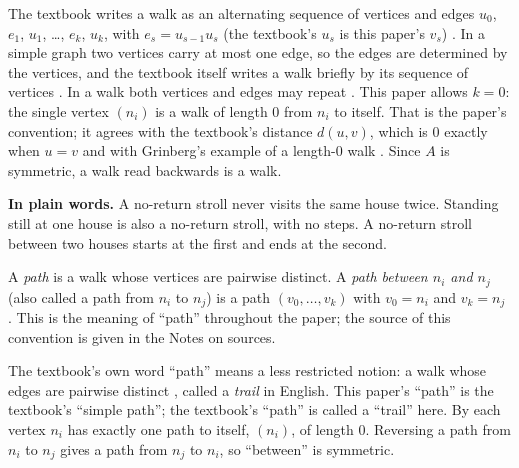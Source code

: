 The textbook writes a walk as an alternating sequence of vertices and edges $u_0$, $e_1$, $u_1$, \dots, $e_k$, $u_k$, with $e_s = u_{s-1}u_s$ (the textbook's $u_s$ is this paper's $v_s$) \cite[Definition 1.2.10, p.~21]{petrosyan_graph_theory}. In a simple graph two vertices carry at most one edge, so the edges are determined by the vertices, and the textbook itself writes a walk briefly by its sequence of vertices \cite[p.~21, the sentence after Definition 1.2.10]{petrosyan_graph_theory}. In a walk both vertices and edges may repeat \cite[p.~22]{petrosyan_graph_theory}. This paper allows $k = 0$: the single vertex $(n_i)$ is a walk of length $0$ from $n_i$ to itself. That is the paper's convention; it agrees with the textbook's distance $d(u,v)$, which is $0$ exactly when $u = v$ \cite[p.~23]{petrosyan_graph_theory} and with Grinberg's example of a length-$0$ walk \cite[Example 2.9.2, p.~37]{grinberg_graph_theory}. Since $A$ is symmetric, a walk read backwards is a walk.

\plainstart\textbf{In plain words.} A no-return stroll never visits the same house twice. Standing still at one house is also a no-return stroll, with no steps. A no-return stroll between two houses starts at the first and ends at the second.\plainend
\begin{definition}\label{def:path}
A \emph{path} is a walk whose vertices are pairwise distinct. A \emph{path between $n_i$ and $n_j$} (also called a path from $n_i$ to $n_j$) is a path $(v_0, \dots, v_k)$ with $v_0 = n_i$ and $v_k = n_j$ \cite[Definition 1.2.13, p.~22]{petrosyan_graph_theory} \cite[Definition 2.9.1(c),(d), p.~36]{grinberg_graph_theory} \cite[definition of path after Theorem 1, p.~1]{bai_bimsa_adjacency}. This is the meaning of ``path'' throughout the paper; the source of this convention is given in the Notes on sources.
\end{definition}

\begin{remark}\label{rem:trap}
The textbook's own word ``path'' means a less restricted notion: a walk whose edges are pairwise distinct \cite[Definition 1.2.12, p.~22]{petrosyan_graph_theory}, called a \emph{trail} in English. This paper's ``path'' is the textbook's ``simple path''; the textbook's ``path'' is called a ``trail'' here. By  each vertex $n_i$ has exactly one path to itself, $(n_i)$, of length $0$. Reversing a path from $n_i$ to $n_j$ gives a path from $n_j$ to $n_i$, so ``between'' is symmetric.
\end{remark}


